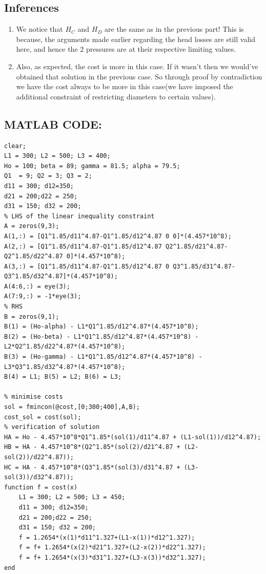 \documentclass{homework}
\begin{document}
\subsection*{Inferences}
\begin{enumerate}
    \item We notice that $H_C$ and $H_D$ are the same as in the previous part! This is because, the arguments made earlier regarding the head losses are still valid here, and hence the 2 pressures are at their respective limiting values.
    \item Also, as expected, the cost is more in this case. If it wasn't then we would've obtained that solution in the previous case. So through proof by contradiction we have the cost always to be more in this case(we have imposed the additional constraint of restricting diameters to certain values).
\end{enumerate}
\subsection*{MATLAB CODE:}
    \begin{verbatim}
clear;
L1 = 300; L2 = 500; L3 = 400;
Ho = 100; beta = 89; gamma = 81.5; alpha = 79.5;
Q1  = 9; Q2 = 3; Q3 = 2;
d11 = 300; d12=350;
d21 = 200;d22 = 250;
d31 = 150; d32 = 200;
% LHS of the linear inequality constraint
A = zeros(9,3);
A(1,:) = [Q1^1.85/d11^4.87-Q1^1.85/d12^4.87 0 0]*(4.457*10^8);
A(2,:) = [Q1^1.85/d11^4.87-Q1^1.85/d12^4.87 Q2^1.85/d21^4.87-Q2^1.85/d22^4.87 0]*(4.457*10^8);
A(3,:) = [Q1^1.85/d11^4.87-Q1^1.85/d12^4.87 0 Q3^1.85/d31^4.87-Q3^1.85/d32^4.87]*(4.457*10^8);
A(4:6,:) = eye(3);
A(7:9,:) = -1*eye(3);
% RHS
B = zeros(9,1);
B(1) = (Ho-alpha) - L1*Q1^1.85/d12^4.87*(4.457*10^8);
B(2) = (Ho-beta) - L1*Q1^1.85/d12^4.87*(4.457*10^8) - L2*Q2^1.85/d22^4.87*(4.457*10^8);
B(3) = (Ho-gamma) - L1*Q1^1.85/d12^4.87*(4.457*10^8) - L3*Q3^1.85/d32^4.87*(4.457*10^8);
B(4) = L1; B(5) = L2; B(6) = L3;

% minimise costs
sol = fmincon(@cost,[0;300;400],A,B);
cost_sol = cost(sol);
% verification of solution
HA = Ho - 4.457*10^8*Q1^1.85*(sol(1)/d11^4.87 + (L1-sol(1))/d12^4.87);
HB = HA - 4.457*10^8*(Q2^1.85*(sol(2)/d21^4.87 + (L2-sol(2))/d22^4.87));
HC = HA - 4.457*10^8*(Q3^1.85*(sol(3)/d31^4.87 + (L3-sol(3))/d32^4.87));
function f = cost(x)
    L1 = 300; L2 = 500; L3 = 450;
    d11 = 300; d12=350;
    d21 = 200;d22 = 250;
    d31 = 150; d32 = 200;
    f = 1.2654*(x(1)*d11^1.327+(L1-x(1))*d12^1.327);
    f = f+ 1.2654*(x(2)*d21^1.327+(L2-x(2))*d22^1.327);
    f = f+ 1.2654*(x(3)*d31^1.327+(L3-x(3))*d32^1.327);
end
\end{verbatim}
    
\end{document}

